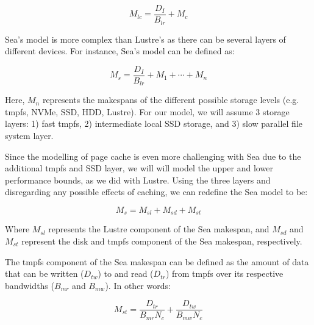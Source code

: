 \documentclass{report}
\begin{document}
    \begin{equation}\label{eq:lustrepc}
        M_{lc} = \frac{D_{I}}{B_{lr}} + M_{c}
    \end{equation}


    Sea's model is more complex than Lustre's as there can be several
    layers of different devices. For instance, Sea's model can be defined as:

    \begin{equation}\label{eq:sea}
        M_{s} = \frac{D_{I}}{B_{lr}} + M_{1} + \cdots + M_{n}
    \end{equation}

    Here, $M_{n}$ represents the makespans of the different possible storage levels
    (e.g. tmpfs, NVMe, SSD, HDD, Lustre). For our model, we will assume 3 storage layers:
    1) fast tmpfs, 2) intermediate local SSD storage, and 3) slow parallel file system layer.
    
    Since the modelling of page cache is even more challenging with Sea due to the additional tmpfs
    and SSD layer, we will will model the upper and lower performance bounds, as we did with Lustre.
    Using the three layers and disregarding any possible effects of caching, we can redefine the
    Sea model to be:

    \begin{equation}\label{eq:snc}
        M_{s} = M_{sl} + M_{sd} + M_{st}
    \end{equation}

    Where $M_{sl}$ represents the Lustre component of the Sea makespan, and
    $M_{sd}$ and $M_{st}$ represent the disk and tmpfs component of the Sea
    makespan, respectively.

    The tmpfs component of the Sea makespan can be defined as the amount of
    data that can be written ($D_{tw}$) to and read ($D_{tr}$) from tmpfs
    over its respective bandwidths ($B_{mr}$ and $B_{mw}$). In other words:

    \begin{equation}\label{eq:mst}
        M_{st} = \frac{D_{tr}}{B_{mr}N_{c}} + \frac{D_{tw}}{B_{mw}N_{c}}
    \end{equation}
\end{document}
